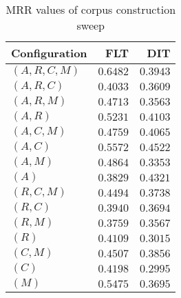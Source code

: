 
\begin{table}
\begin{spacing}{1.2}
\centering
\caption{MRR values of \tika corpus construction sweep}
\label{table:tika_corpus_sweep}
\vspace{0.2em}
\begin{tabular}{lrr}
\toprule
Configuration &           FLT &           DIT \\
\midrule
  $(A,R,C,M)$ & $\bm{0.6482}$ &      $0.3943$ \\
    $(A,R,C)$ &      $0.4033$ &      $0.3609$ \\
    $(A,R,M)$ &      $0.4713$ &      $0.3563$ \\
      $(A,R)$ &      $0.5231$ &      $0.4103$ \\
    $(A,C,M)$ &      $0.4759$ &      $0.4065$ \\
      $(A,C)$ &      $0.5572$ & $\bm{0.4522}$ \\
      $(A,M)$ &      $0.4864$ &      $0.3353$ \\
        $(A)$ &      $0.3829$ &      $0.4321$ \\
    $(R,C,M)$ &      $0.4494$ &      $0.3738$ \\
      $(R,C)$ &      $0.3940$ &      $0.3694$ \\
      $(R,M)$ &      $0.3759$ &      $0.3567$ \\
        $(R)$ &      $0.4109$ &      $0.3015$ \\
      $(C,M)$ &      $0.4507$ &      $0.3856$ \\
        $(C)$ &      $0.4198$ &      $0.2995$ \\
        $(M)$ &      $0.5475$ &      $0.3695$ \\
\bottomrule
\end{tabular}

\end{spacing}
\end{table}
